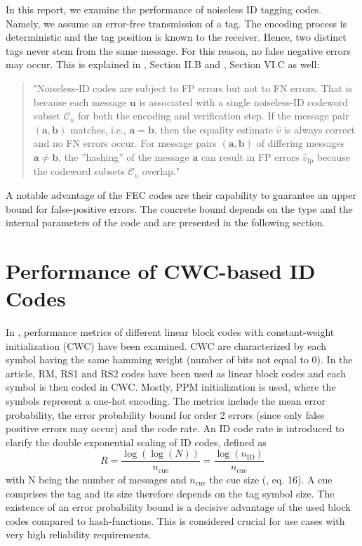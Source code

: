 \documentclass[english,BCOR=4mm,cdfont=false]{tudscrreprt} %
\begin{document}
In this report, we examine the performance of noiseless ID tagging codes. Namely, we assume an error-free transmission of a tag. The encoding process is deterministic and the tag position is known to the receiver. Hence, two distinct tags never stem from the same message. For this reason, no false negative errors may occur. This is explained in \cite{ID_Codes_Topical_Review}, Section II.B and \cite{Codes_for_ID_Tutorial}, Section VI.C  as well: 

\begin{quote}
"Noiseless-ID codes are subject to FP errors but not to FN
errors. That is because each message $\boldsymbol{u}$ is associated with a
 single noiseless-ID codeword subset $\mathcal{C}_u$ for both the encoding
 and verification step. If the message pair $(\boldsymbol{a}, \boldsymbol{b})$ matches, i.e.,
 $\boldsymbol{a} = \boldsymbol{b}$, then the equality estimate $\hat{v}$ is always correct and
 no FN errors occur. For message pairs $(\boldsymbol{a}, \boldsymbol{b})$ of differing
 messages $\boldsymbol{a} \neq \boldsymbol{b}$, the ”hashing” of the message $\boldsymbol{a}$ can result
 in FP errors $\hat{v}_{\text{fp}}$ because the codeword subsets $\mathcal{C}_u$ overlap."
\end{quote}

A notable advantage of the FEC codes are their capability to guarantee an upper bound for false-positive errors. The concrete bound depends on the type and the internal parameters of the code and are presented in the following section.

\section{Performance of CWC-based ID Codes}
\label{sec:perfId}
In \cite{ID_Codes_Topical_Review}, performance metrics of different linear block codes with constant-weight initialization (CWC) have been examined. CWC are characterized by each symbol having the same hamming weight (number of bits not equal to 0). In the article, RM, RS1 and RS2 codes have been used as linear block codes and each symbol is then coded in CWC. Mostly, PPM initialization is used, where the symbols represent a one-hot encoding. The metrics include the mean error probability, the error probability bound for order 2 errors (since only false positive errors may occur) and the code rate. An ID code rate is introduced to clarify the double exponential scaling of ID codes, defined as 
\begin{equation}
    R = \frac{\log(\log(N))}{n_\text{cue}} = \frac{\log(n_\text{ID})}{n_\text{cue}}
\end{equation} with N being the number of messages and $n_\text{cue}$ the cue size (\cite{ID_Codes_Topical_Review}, eq. 16). A cue comprises the tag and its size therefore depends on the tag symbol size. The existence of an error probability bound is a decisive advantage of the used block codes compared to hash-functions. This is considered crucial for use cases with very high reliability requirements.
\end{document}
